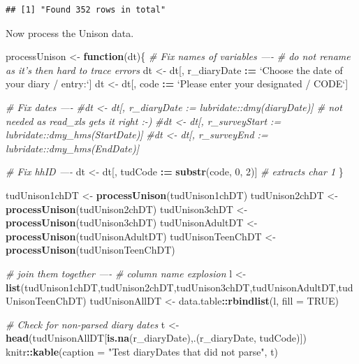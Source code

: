 \documentclass[]{article}
\newenvironment{Shaded}{\begin{snugshade}}{\end{snugshade}}
\newcommand{\KeywordTok}[1]{\textcolor[rgb]{0.13,0.29,0.53}{\textbf{#1}}}
\newcommand{\DataTypeTok}[1]{\textcolor[rgb]{0.13,0.29,0.53}{#1}}
\newcommand{\DecValTok}[1]{\textcolor[rgb]{0.00,0.00,0.81}{#1}}
\newcommand{\StringTok}[1]{\textcolor[rgb]{0.31,0.60,0.02}{#1}}
\newcommand{\CommentTok}[1]{\textcolor[rgb]{0.56,0.35,0.01}{\textit{#1}}}
\newcommand{\OtherTok}[1]{\textcolor[rgb]{0.56,0.35,0.01}{#1}}
\newcommand{\ControlFlowTok}[1]{\textcolor[rgb]{0.13,0.29,0.53}{\textbf{#1}}}
\newcommand{\OperatorTok}[1]{\textcolor[rgb]{0.81,0.36,0.00}{\textbf{#1}}}
\newcommand{\ErrorTok}[1]{\textcolor[rgb]{0.64,0.00,0.00}{\textbf{#1}}}
\newcommand{\NormalTok}[1]{#1}
\begin{document}
\begin{verbatim}
## [1] "Found 352 rows in total"
\end{verbatim}

Now process the Unison data.

\begin{Shaded}
\begin{Highlighting}[]
\NormalTok{processUnison <-}\StringTok{ }\ControlFlowTok{function}\NormalTok{(dt)\{}
  \CommentTok{# Fix names of variables ----}
  \CommentTok{# do not rename as it's then hard to trace errors}
\NormalTok{  dt <-}\StringTok{ }\NormalTok{dt[, r_diaryDate }\OperatorTok{:}\ErrorTok{=}\StringTok{ `}\DataTypeTok{Choose the date of your diary / entry:}\StringTok{`}\NormalTok{]}
\NormalTok{  dt <-}\StringTok{ }\NormalTok{dt[, code }\OperatorTok{:}\ErrorTok{=}\StringTok{ `}\DataTypeTok{Please enter your designated / CODE}\StringTok{`}\NormalTok{]}

  \CommentTok{# Fix dates ----}
  \CommentTok{#dt <- dt[, r_diaryDate := lubridate::dmy(diaryDate)] # not needed as read_xls gets it right :-)}
  \CommentTok{#dt <- dt[, r_surveyStart := lubridate::dmy_hms(StartDate)]}
  \CommentTok{#dt <- dt[, r_surveyEnd := lubridate::dmy_hms(EndDate)]}
  
  \CommentTok{# Fix hhID ----}
\NormalTok{  dt <-}\StringTok{ }\NormalTok{dt[, tudCode }\OperatorTok{:}\ErrorTok{=}\StringTok{ }\KeywordTok{substr}\NormalTok{(code, }\DecValTok{0}\NormalTok{, }\DecValTok{2}\NormalTok{)] }\CommentTok{# extracts char 1}
\NormalTok{\}}

\NormalTok{tudUnison1chDT <-}\StringTok{ }\KeywordTok{processUnison}\NormalTok{(tudUnison1chDT)}
\NormalTok{tudUnison2chDT <-}\StringTok{ }\KeywordTok{processUnison}\NormalTok{(tudUnison2chDT)}
\NormalTok{tudUnison3chDT <-}\StringTok{ }\KeywordTok{processUnison}\NormalTok{(tudUnison3chDT)}
\NormalTok{tudUnisonAdultDT <-}\StringTok{ }\KeywordTok{processUnison}\NormalTok{(tudUnisonAdultDT)}
\NormalTok{tudUnisonTeenChDT <-}\StringTok{ }\KeywordTok{processUnison}\NormalTok{(tudUnisonTeenChDT)}


\CommentTok{# join them together ----}
\CommentTok{# column name explosion}
\NormalTok{l <-}\StringTok{ }\KeywordTok{list}\NormalTok{(tudUnison1chDT,tudUnison2chDT,tudUnison3chDT,tudUnisonAdultDT,tudUnisonTeenChDT)}
\NormalTok{tudUnisonAllDT <-}\StringTok{ }\NormalTok{data.table}\OperatorTok{::}\KeywordTok{rbindlist}\NormalTok{(l, }\DataTypeTok{fill =} \OtherTok{TRUE}\NormalTok{)}

\CommentTok{# Check for non-parsed diary dates}
\NormalTok{t <-}\StringTok{ }\KeywordTok{head}\NormalTok{(tudUnisonAllDT[}\KeywordTok{is.na}\NormalTok{(r_diaryDate),.(r_diaryDate, tudCode)])}
\NormalTok{knitr}\OperatorTok{::}\KeywordTok{kable}\NormalTok{(}\DataTypeTok{caption =} \StringTok{"Test diaryDates that did not parse"}\NormalTok{, t)}
\end{Highlighting}
\end{Shaded}
\end{document}
